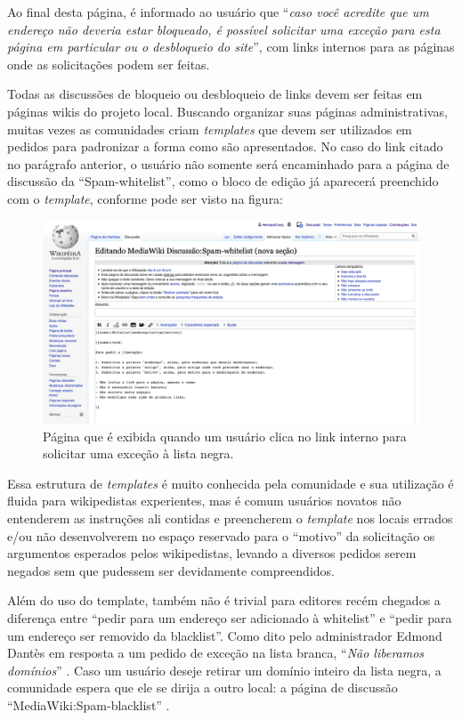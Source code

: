 Ao final desta página, é informado ao usuário que ``\textit{caso você acredite que um endereço não deveria estar bloqueado, é possível solicitar uma exceção para esta página em particular ou o desbloqueio do site}'', com links internos para as páginas onde as solicitações podem ser feitas.

Todas as discussões de bloqueio ou desbloqueio de links devem ser feitas em páginas wikis do projeto local. Buscando organizar suas páginas administrativas, muitas vezes as comunidades criam \textit{templates} que devem ser utilizados em pedidos para padronizar a forma como são apresentados. No caso do link citado no parágrafo anterior, o usuário não somente será encaminhado para a página de discussão da ``Spam-whitelist'', como o bloco de edição já aparecerá preenchido com o \textit{template}, conforme pode ser visto na figura:

\begin{figure}[H]
    \centering
    \includegraphics[width=1\textwidth]{Images/mediawiki_spam_whitelist.png}
    \caption{Página que é exibida quando um usuário clica no link interno para solicitar uma exceção à lista negra.}
    \label{fig:mediawiki_spam_whitelist}
\end{figure}

Essa estrutura de \textit{templates} é muito conhecida pela comunidade e sua utilização é fluida para wikipedistas experientes, mas é comum usuários novatos não entenderem as instruções ali contidas e preencherem o \textit{template} nos locais errados e/ou não desenvolverem no espaço reservado para o ``motivo'' da solicitação os argumentos esperados pelos wikipedistas, levando a diversos pedidos serem negados sem que pudessem ser devidamente compreendidos. 

Além do uso do template, também não é trivial para editores recém chegados a diferença entre ``pedir para um endereço ser adicionado à whitelist'' e ``pedir para um endereço ser removido da blacklist''. Como dito pelo administrador Edmond Dantès em resposta a um pedido de exceção na lista branca, ``\textit{Não liberamos domínios}'' . Caso um usuário deseje retirar um domínio inteiro da lista negra, a comunidade espera que ele se dirija a outro local: a página de discussão ``MediaWiki:Spam-blacklist'' .


